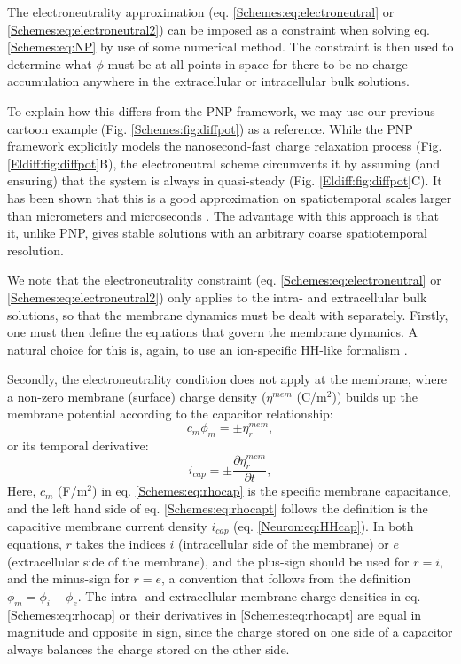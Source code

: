The electroneutrality approximation (eq. \ref{Schemes:eq:electroneutral} or \ref{Schemes:eq:electroneutral2}) can be imposed as a constraint when solving eq.\ref{Schemes:eq:NP} by use of some numerical method. The constraint is then used to determine what $\phi$ must be at all points in space for there to be no charge accumulation anywhere in the extracellular or intracellular bulk solutions.

To explain how this differs from the PNP framework, we may use our previous cartoon example (Fig. \ref{Schemes:fig:diffpot}) as a reference. While the PNP framework explicitly models the nanosecond-fast charge relaxation process (Fig. \ref{Eldiff:fig:diffpot}B), the electroneutral scheme circumvents it by assuming (and ensuring) that the system is always in quasi-steady (Fig. \ref{Eldiff:fig:diffpot}C). It has been shown that this is a good approximation on spatiotemporal scales larger than micrometers and microseconds \citep{Grodzinsky2011, Pods2017, Solbra2018}. The advantage with this approach is that it, unlike PNP, gives stable solutions with an arbitrary coarse spatiotemporal resolution.

We note that the electroneutrality constraint (eq. \ref{Schemes:eq:electroneutral} or \ref{Schemes:eq:electroneutral2}) only applies to the intra- and extracellular bulk solutions, so that the membrane dynamics must be dealt with separately. Firstly, one must then define the equations that govern the membrane dynamics. A natural choice for this is, again, to use an ion-specific HH-like formalism \citep{Mori2006, Mori2009, Pods2017, ellingsrud2020}. 

Secondly, the electroneutrality condition does not apply at the membrane, where a non-zero membrane (surface) charge density ($\eta^{mem}$ (C/m$^2$)) builds up the membrane potential according to the capacitor relationship:
\begin{equation}
c_m \phi_{m} = \pm \eta_{r}^{mem},
\label{Schemes:eq:rhocap}
\end{equation}
or its temporal derivative: 
\begin{equation}
i_{cap} = \pm \frac{\partial \eta_{r}^{mem}}{\partial t},
\label{Schemes:eq:rhocapt}
\end{equation}
Here, $c_m$ (F/m$^2$) in eq. \ref{Schemes:eq:rhocap} is the specific membrane capacitance, and the left hand side of eq. \ref{Schemes:eq:rhocapt} follows the definition is the capacitive membrane current density $i_{cap}$  (eq. \ref{Neuron:eq:HHcap}). In both equations, $r$ takes the indices $i$ (intracellular side of the membrane) or $e$ (extracellular side of the membrane), and the plus-sign should be used for $r=i$, and the minus-sign for $r=e$, a convention that follows from the definition $\phi_{m} = \phi_{i} - \phi_{e}$. The intra- and extracellular membrane charge densities in eq. \ref{Schemes:eq:rhocap} or their derivatives in \ref{Schemes:eq:rhocapt} are equal in magnitude and opposite in sign, since the charge stored on one side of a capacitor always balances the charge stored on the other side. 

